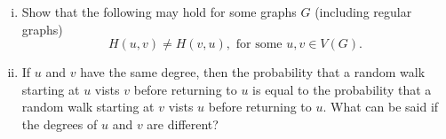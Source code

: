 \documentclass[11pt]{scrartcl}
\begin{document}
\begin{problem}
    \begin{enumerate}[(i)]
        \item Show that the following may hold for some graphs $G$ (including regular graphs)
        \[H(u,v)\neq H(v,u),\text{ for some }u,v\in V(G).\]
        \item If $u$ and $v$ have the same degree, then the probability that a random walk starting at $u$ vists $v$ before returning to $u$ is equal to the probability that a random walk starting at $v$ vists $u$ before returning to $u$. What can be said if the degrees of $u$ and $v$ are different?
    \end{enumerate}
\end{problem}
\end{document}
